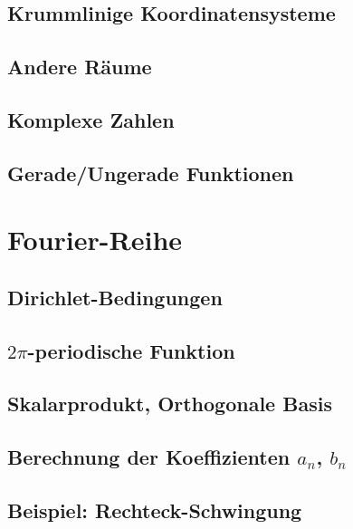 \documentclass[a4paper, 11pt, accentcolor = tud3b]{tudreport}
\begin{document}
			\subsection{Krummlinige Koordinatensysteme} %

			\subsection{Andere Räume} %

			\subsection{Komplexe Zahlen} %

			\subsection{Gerade/Ungerade Funktionen} %

		\section{Fourier-Reihe} %

			\subsection{Dirichlet-Bedingungen} %

			\subsection{\(2\pi\)-periodische Funktion} %

			\subsection{Skalarprodukt, Orthogonale Basis} %

			\subsection{Berechnung der Koeffizienten \(a_n\), \(b_n\)} %

			\subsection{Beispiel: Rechteck-Schwingung} %
\end{document}
